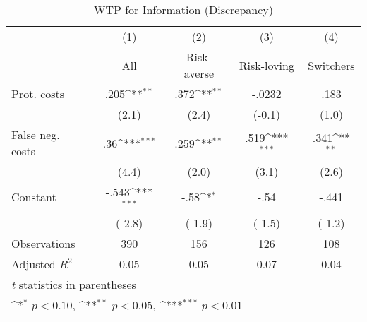 \begin{table}[htbp]\centering
\def\sym#1{\ifmmode^{#1}\else\(^{#1}\)\fi}
\caption{WTP for Information (Discrepancy)}
\begin{tabular}{l*{4}{c}}
\hline\hline
                &\multicolumn{1}{c}{(1)}&\multicolumn{1}{c}{(2)}&\multicolumn{1}{c}{(3)}&\multicolumn{1}{c}{(4)}\\
                &\multicolumn{1}{c}{All}&\multicolumn{1}{c}{Risk-averse}&\multicolumn{1}{c}{Risk-loving}&\multicolumn{1}{c}{Switchers}\\
\hline
Prot. costs     &     .205\sym{**} &     .372\sym{**} &   -.0232         &     .183         \\
                &    (2.1)         &    (2.4)         &   (-0.1)         &    (1.0)         \\
False neg. costs&      .36\sym{***}&     .259\sym{**} &     .519\sym{***}&     .341\sym{**} \\
                &    (4.4)         &    (2.0)         &    (3.1)         &    (2.6)         \\
Constant        &    -.543\sym{***}&     -.58\sym{*}  &     -.54         &    -.441         \\
                &   (-2.8)         &   (-1.9)         &   (-1.5)         &   (-1.2)         \\
\hline
Observations    &      390         &      156         &      126         &      108         \\
Adjusted \(R^{2}\)&     0.05         &     0.05         &     0.07         &     0.04         \\
\hline\hline
\multicolumn{5}{l}{\footnotesize \textit{t} statistics in parentheses}\\
\multicolumn{5}{l}{\footnotesize \sym{*} \(p<0.10\), \sym{**} \(p<0.05\), \sym{***} \(p<0.01\)}\\
\end{tabular}
\end{table}
